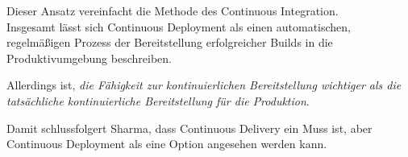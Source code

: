 Dieser Ansatz vereinfacht die Methode des Continuous Integration. \\

Insgesamt lässt sich Continuous Deployment als einen automatischen, regelmäßigen Prozess der Bereitstellung erfolgreicher Builds in die Produktivumgebung beschreiben.

Allerdings ist, \textit{die Fähigkeit zur kontinuierlichen Bereitstellung wichtiger als die tatsächliche kontinuierliche Bereitstellung für die Produktion}. \cite[S. 19]{sharma_devops_2017}

Damit schlussfolgert Sharma, dass Continuous Delivery ein Muss ist, aber Continuous Deployment als eine Option angesehen werden kann.  






 











  











 





